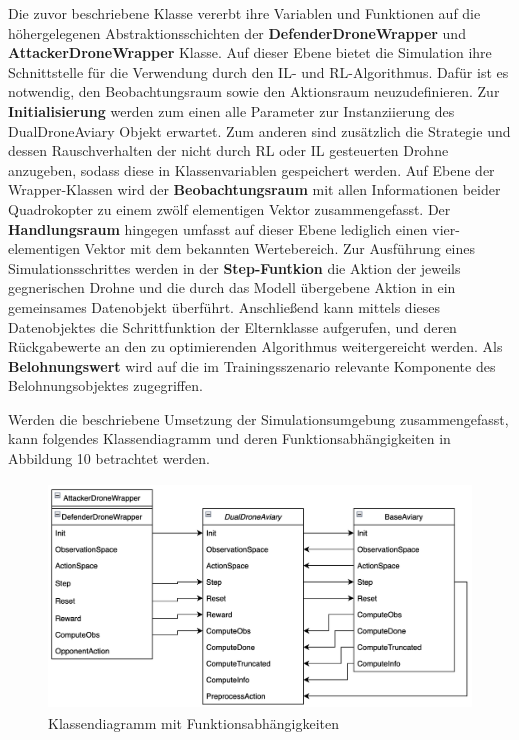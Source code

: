 Die zuvor beschriebene Klasse vererbt ihre Variablen und Funktionen auf die höhergelegenen Abstraktionsschichten der \textbf{DefenderDroneWrapper} und \textbf{AttackerDroneWrapper} Klasse.
Auf dieser Ebene bietet die Simulation ihre Schnittstelle für die Verwendung durch den IL- und RL-Algorithmus.
Dafür ist es notwendig, den Beobachtungsraum sowie den Aktionsraum neuzudefinieren.
Zur \textbf{Initialisierung} werden zum einen alle Parameter zur Instanziierung des DualDroneAviary Objekt erwartet.
Zum anderen sind zusätzlich die Strategie und dessen Rauschverhalten der nicht durch RL oder IL gesteuerten Drohne anzugeben, sodass diese in Klassenvariablen gespeichert werden.
Auf Ebene der Wrapper-Klassen wird der \textbf{Beobachtungsraum} mit allen Informationen beider Quadrokopter zu einem zwölf elementigen Vektor zusammengefasst.
Der \textbf{Handlungsraum} hingegen umfasst auf dieser Ebene lediglich einen vier-elementigen Vektor mit dem bekannten Wertebereich.
Zur Ausführung eines Simulationsschrittes werden in der \textbf{Step-Funtkion} die Aktion der jeweils gegnerischen Drohne und die durch das Modell übergebene Aktion in ein gemeinsames Datenobjekt überführt.
Anschließend kann mittels dieses Datenobjektes die Schrittfunktion der Elternklasse aufgerufen, und deren Rückgabewerte an den zu optimierenden Algorithmus weitergereicht werden.
Als \textbf{Belohnungswert} wird auf die im Trainingsszenario relevante Komponente des Belohnungsobjektes zugegriffen.

Werden die beschriebene Umsetzung der Simulationsumgebung zusammengefasst, kann folgendes Klassendiagramm und deren Funktionsabhängigkeiten in Abbildung 10 betrachtet werden.

\begin{figure}[htb]
    \centering
    \includegraphics[height=6cm]{lib/graphics/simenv structure.png}
    \caption[Klassendiagramm mit Funktionsabhängigkeiten]{Klassendiagramm mit Funktionsabhängigkeiten\footnotemark}
    \label{abb:drone axis}
\end{figure}

